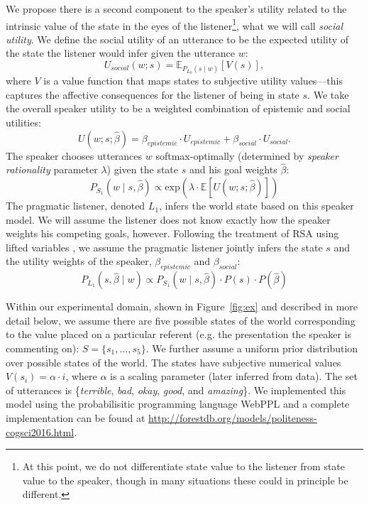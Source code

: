 \documentclass[10pt,letterpaper]{article}
\begin{document}
We propose there is a second component to the speaker's utility related to the intrinsic value of the state in the eyes of the listener\footnote{At this point, we do not differentiate state value to the listener from state value to the speaker, though in many situations these could in principle be different.}, what we will call \emph{social utility}.
%
We define the social utility of an utterance to be the expected utility of the state the listener would infer given the utterance $w$:
$$
U_{social}(w; s) = \mathbb{E}_{P_{L_0}(s \mid w)}[V(s)],
$$
%
where $V$ is a value function that maps states to subjective utility values---this captures the affective consequences for the listener of being in state $s$.
%
We take the overall speaker utility to be a weighted combination of epistemic and social utilities:
$$
U(w;s;  \hat{\beta}) = \beta_{epistemic}\cdot U_{epistemic} + \beta_{social} \cdot U_{social}.
$$
%
%
The speaker chooses utterances $w$ softmax-optimally (determined by \emph{speaker rationality} parameter $\lambda$) given the state $s$ and his goal weights $\hat{\beta}$: 
\begin{equation}
P_{S_1}(w \mid s, \hat{\beta}) \propto \mathrm{exp}(\lambda \cdot \mathbb{E}[U(w; s;  \hat{\beta})])\label{eq:S1}
\end{equation}
%
%
The pragmatic listener, denoted $L_1$, infers the world state based on this speaker model.
We will assume the listener does not know exactly how the speaker weights his competing goals, however.
Following the treatment of RSA using lifted variables \cite{GoodmanLassiter2015, bergen2016, Kao2014},
we assume the pragmatic listener jointly infers the state $s$ and the utility weights of the speaker, $\beta_{epistemic}$ and $\beta_{social}$:
\begin{equation}
P_{L_1}(s,  \hat{\beta} \mid w)\propto P_{S_1}(w \mid s,  \hat{\beta})\cdot P(s) \cdot P( \hat{\beta}) \label{eq:L1}
\end{equation}

Within our experimental domain, shown in Figure~\ref{fig:ex} and described in more detail below, we assume there are five possible states of the world corresponding to the value placed on a particular referent (e.g. the presentation the speaker is commenting on): $S = \{s_{1}, ...,  s_{5}\}$.
We further assume a uniform prior distribution over possible states of the world.
The states have subjective numerical values $V(s_{i}) = \alpha \cdot i$, where $\alpha$ is a scaling parameter (later inferred from data).
The set of utterances is \{\emph{terrible}, \emph{bad}, \emph{okay}, \emph{good}, and \emph{amazing}\}.
We implemented this model using the probabilisitic programming language WebPPL \cite{dippl} and a complete implementation can be found at \url{http://forestdb.org/models/politeness-cogsci2016.html}.
\end{document}
